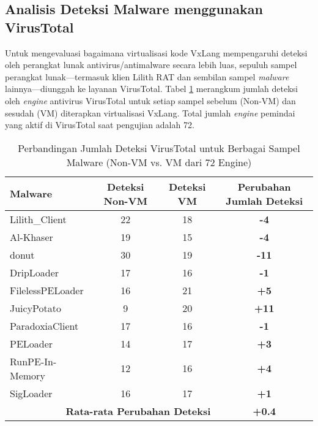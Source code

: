 \subsection{Analisis Deteksi Malware menggunakan VirusTotal}
\label{subsec:analisis_virustotal_all_malware}
Untuk mengevaluasi bagaimana virtualisasi kode VxLang mempengaruhi deteksi oleh perangkat lunak antivirus/antimalware secara lebih luas, sepuluh sampel perangkat lunak—termasuk klien Lilith RAT dan sembilan sampel \textit{malware} lainnya—diunggah ke layanan VirusTotal. Tabel \ref{tab:virustotal_all_malware_bab5} merangkum jumlah deteksi oleh \textit{engine} antivirus VirusTotal untuk setiap sampel sebelum (Non-VM) dan sesudah (VM) diterapkan virtualisasi VxLang. Total jumlah \textit{engine} pemindai yang aktif di VirusTotal saat pengujian adalah 72.

\begin{table}[H]
    \centering
    \caption{Perbandingan Jumlah Deteksi VirusTotal untuk Berbagai Sampel Malware (Non-VM vs. VM dari 72 Engine)}
    \label{tab:virustotal_all_malware_bab5}
    \begin{tabular}{@{}lccc@{}}
        \toprule
        \textbf{Malware} & \textbf{Deteksi Non-VM} & \textbf{Deteksi VM} & \textbf{Perubahan Jumlah Deteksi} \\
        \midrule
        Lilith\_Client    & 22 & 18 & \textbf{-4} \\
        Al-Khaser         & 19 & 15 & \textbf{-4} \\
        donut             & 30 & 19 & \textbf{-11} \\
        DripLoader        & 17 & 16 & \textbf{-1} \\
        FilelessPELoader  & 16 & 21 & \textbf{+5} \\
        JuicyPotato       & 9  & 20 & \textbf{+11} \\
        ParadoxiaClient   & 17 & 16 & \textbf{-1} \\
        PELoader          & 14 & 17 & \textbf{+3} \\
        RunPE-In-Memory   & 12 & 16 & \textbf{+4} \\
        SigLoader         & 16 & 17 & \textbf{+1} \\
        \midrule
        \multicolumn{3}{r}{\textbf{Rata-rata Perubahan Deteksi}} & \textbf{+0.4} \\
        \bottomrule
    \end{tabular}
\end{table}


